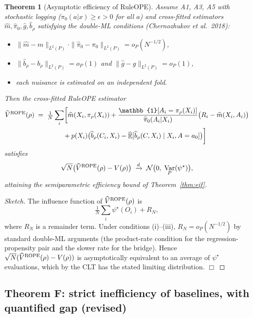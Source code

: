 \documentclass[11pt]{article}
\newtheorem{theorem}{Theorem}
\DeclareMathOperator{\E}{\mathbb{E}}
\DeclareMathOperator{\Var}{Var}
\begin{document}
\begin{theorem}[Asymptotic efficiency of RuleOPE]\label{thm:efficient}
Assume A1, A3, A5 with stochastic logging
($\pi_0(a | x) \ge \epsilon > 0$ for all $a$) and cross-fitted estimators
$\widehat m, \widehat \pi_0, \widehat g, \widehat b_\rho$ satisfying the
double-ML conditions (Chernozhukov et al.\ 2018):
\begin{itemize}
\item[(i)] $\|\widehat m - m\|_{L^2(P)} \cdot \|\widehat \pi_0 - \pi_0\|_{L^2(P)} = o_P(N^{-1/2})$,
\item[(ii)] $\|\widehat b_\rho - b_\rho\|_{L^2(P)} = o_P(1)$
  and $\|\widehat g - g\|_{L^2(P)} = o_P(1)$,
\item[(iii)] each nuisance is estimated on an independent fold.
\end{itemize}
Then the cross-fitted RuleOPE estimator
\begin{align}
\widehat V^{\rm ROPE}(\rho) \;&=\; \tfrac{1}{N}\sum_i \biggl[ \widehat m(X_i, \pi_\rho(X_i))
+ \frac{\mathbb{1}[A_i = \pi_\rho(X_i)]}{\widehat \pi_0(A_i | X_i)}\bigl(R_i - \widehat m(X_i, A_i)\bigr) \nonumber \\
&\qquad\qquad + p(X_i)\bigl(\widehat b_\rho(C_i, X_i)
    - \widehat{\E}[\widehat b_\rho(C, X_i) \mid X_i, A = a_0]\bigr) \biggr]
\label{eq:rope-eif}
\end{align}
satisfies
\begin{equation}
\sqrt{N}\bigl(\widehat V^{\rm ROPE}(\rho) - V(\rho)\bigr) \;\xrightarrow{d}\; \mathcal{N}\bigl(0,\; \Var_P(\psi^\star)\bigr),
\end{equation}
attaining the semiparametric efficiency bound of
Theorem~\ref{thm:eif}.
\end{theorem}
\begin{proof}[Sketch]
The influence function of $\widehat V^{\rm ROPE}(\rho)$ is
$$
\tfrac{1}{N}\sum_i \psi^\star(O_i) + R_N,
$$
where $R_N$ is a remainder term.  Under conditions (i)--(iii), $R_N =
o_P(N^{-1/2})$ by standard double-ML arguments (the product-rate
condition for the regression-propensity pair and the slower rate for
the bridge).  Hence $\sqrt{N}(\widehat V^{\rm ROPE}(\rho) - V(\rho))$
is asymptotically equivalent to an average of $\psi^\star$ evaluations,
which by the CLT has the stated limiting distribution.  $\Box$
\end{proof}

\subsection{Theorem F: strict inefficiency of baselines, with quantified gap (revised)}
\end{document}
